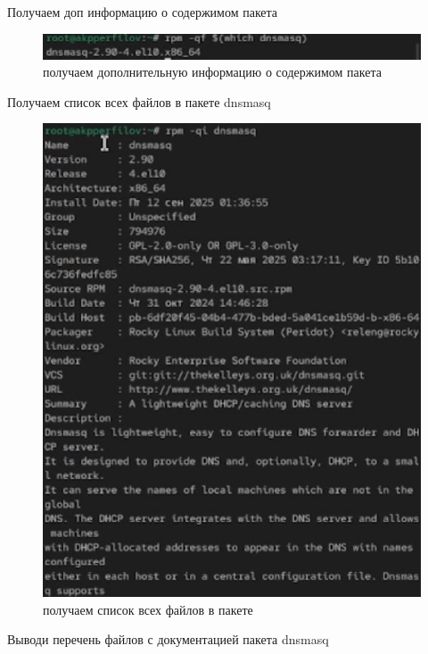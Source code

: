 \documentclass[
  english,
  russian,
  12pt,
  a4paper,
  DIV=11,
  numbers=noendperiod]{scrreprt}
\begin{document}
Получаем доп информацию о содержимом пакета

\begin{figure}

{\centering \includegraphics[width=0.3\linewidth,height=\textheight,keepaspectratio]{image/35.jpg}

}

\caption{получаем дополнительную информацию о содержимом пакета}

\end{figure}%

Получаем список всех файлов в пакете dnsmasq

\begin{figure}

{\centering \includegraphics[width=0.71\linewidth,height=\textheight,keepaspectratio]{image/36.jpg}

}

\caption{получаем список всех файлов в пакете}

\end{figure}%

Выводи перечень файлов с документацией пакета dnsmasq
\end{document}
